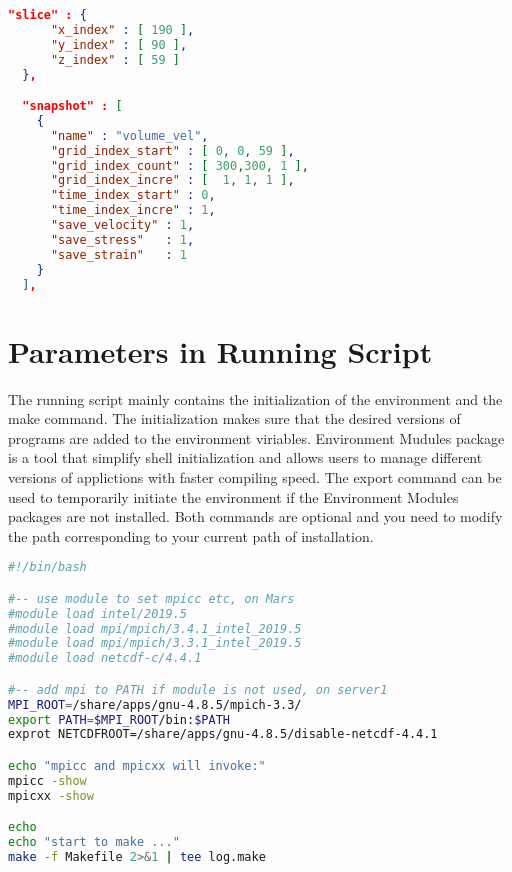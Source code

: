 \begin{itemize}
\begin{lstlisting}[language=json,
 frame=tb]
  "slice" : {
      "x_index" : [ 190 ],
      "y_index" : [ 90 ],
      "z_index" : [ 59 ]
  },

  "snapshot" : [
    {
      "name" : "volume_vel",
      "grid_index_start" : [ 0, 0, 59 ],
      "grid_index_count" : [ 300,300, 1 ],
      "grid_index_incre" : [  1, 1, 1 ],
      "time_index_start" : 0,
      "time_index_incre" : 1,
      "save_velocity" : 1,
      "save_stress"   : 1,
      "save_strain"   : 1
    }
  ], 
\end{lstlisting}
\end{itemize}
\section{Parameters in Running Script}
The running script mainly contains the initialization of the environment and the make command. The initialization makes sure that the desired versions of programs are added to the environment viriables. Environment Mudules package is a tool that simplify shell initialization and allows users to manage different versions of applictions with faster compiling speed. The export command can be used to temporarily initiate the environment if the Environment Modules packages are not installed. Both commands are optional and you need to modify the path corresponding to your current path of installation.    
\begin{lstlisting}[language=bash,
    label={run_make_sh},
    caption=The running script in .json,
    frame=tb]
#!/bin/bash

#-- use module to set mpicc etc, on Mars
#module load intel/2019.5
#module load mpi/mpich/3.4.1_intel_2019.5
#module load mpi/mpich/3.3.1_intel_2019.5
#module load netcdf-c/4.4.1

#-- add mpi to PATH if module is not used, on server1
MPI_ROOT=/share/apps/gnu-4.8.5/mpich-3.3/
export PATH=$MPI_ROOT/bin:$PATH
exprot NETCDFROOT=/share/apps/gnu-4.8.5/disable-netcdf-4.4.1

echo "mpicc and mpicxx will invoke:"
mpicc -show
mpicxx -show

echo
echo "start to make ..."
make -f Makefile 2>&1 | tee log.make
\end{lstlisting}
